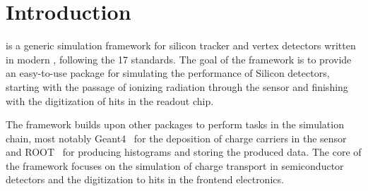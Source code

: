 \chapter{Introduction}
\label{ch:introduction}
\apsq is a generic simulation framework for silicon tracker and vertex detectors written in modern \CPP, following the {\CPP}17 standards.
The goal of the \apsq framework is to provide an easy-to-use package for simulating the performance of Silicon detectors, starting with the passage of ionizing radiation through the sensor and finishing with the digitization of hits in the readout chip.

The framework builds upon other packages to perform tasks in the simulation chain, most notably Geant4~\cite{geant4} for the deposition of charge carriers in the sensor and ROOT~\cite{root} for producing histograms and storing the produced data.
The core of the framework focuses on the simulation of charge transport in semiconductor detectors and the digitization to hits in the frontend electronics.

